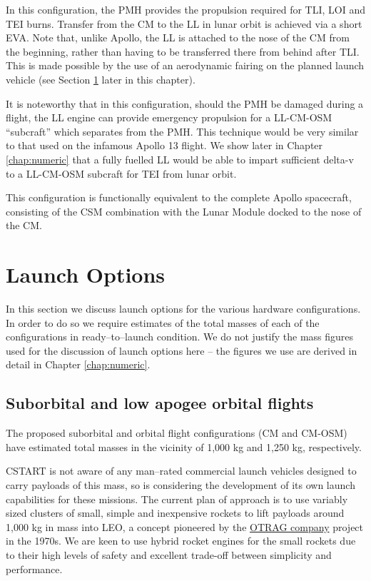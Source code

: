 \documentclass{report}
\begin{document}
In this configuration, the PMH provides the propulsion required for TLI, LOI and TEI burns.  Transfer from the CM to the LL in lunar orbit is achieved via a short EVA.  Note that, unlike Apollo, the LL is attached to the nose of the CM from the beginning, rather than having to be transferred there from behind after TLI.  This is made possible by the use of an aerodynamic fairing on the planned launch vehicle (see Section \ref{sec:launchopt} later in this chapter).

It is noteworthy that in this configuration, should the PMH be damaged during a flight, the LL engine can provide emergency propulsion for a LL-CM-OSM ``subcraft'' which separates from the PMH.  This technique would be very similar to that used on the infamous Apollo 13 flight.  We show later in Chapter \ref{chap:numeric} that a fully fuelled LL would be able to impart sufficient delta-v to a LL-CM-OSM subcraft for TEI from lunar orbit.

This configuration is functionally equivalent to the complete Apollo spacecraft, consisting of the CSM combination with the Lunar Module docked to the nose of the CM.

\section{Launch Options} \label{sec:launchopt}

In this section we discuss launch options for the various hardware configurations.  In order to do so we require estimates of the total masses of each of the configurations in ready--to--launch condition.  We do not justify the mass figures used for the discussion of launch options here -- the figures we use are derived in detail in Chapter \ref{chap:numeric}.

\subsection{Suborbital and low apogee orbital flights}

The proposed suborbital and orbital flight configurations (CM and CM-OSM) have estimated total masses in the vicinity of 1,000 kg and 1,250 kg, respectively.

CSTART is not aware of any man--rated commercial launch vehicles designed to carry payloads of this mass, so is considering the development of its own launch capabilities for these missions.  The current plan of approach is to use variably sized clusters of small, simple and inexpensive rockets to lift payloads around 1,000 kg in mass into LEO, a concept pioneered by the \href{http://en.wikipedia.org/wiki/OTRAG}{OTRAG company} project in the 1970s.  We are keen to use hybrid rocket engines for the small rockets due to their high levels of safety and excellent trade-off between simplicity and performance.
\end{document}
